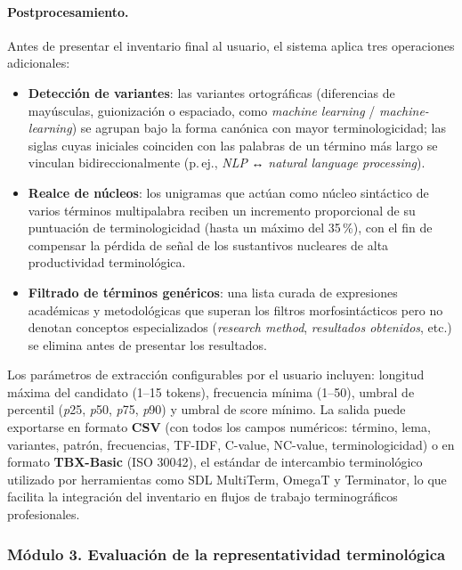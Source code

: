 \paragraph{Postprocesamiento.} Antes de presentar el inventario final al usuario, el sistema aplica tres operaciones adicionales:

\begin{itemize}
    \item \textbf{Detección de variantes}: las variantes ortográficas (diferencias de mayúsculas, guionización o espaciado, como \textit{machine learning} / \textit{machine-learning}) se agrupan bajo la forma canónica con mayor terminologicidad; las siglas cuyas iniciales coinciden con las palabras de un término más largo se vinculan bidireccionalmente (p.\,ej., \textit{NLP} ↔ \textit{natural language processing}).
    \item \textbf{Realce de núcleos}: los unigramas que actúan como núcleo sintáctico de varios términos multipalabra reciben un incremento proporcional de su puntuación de terminologicidad (hasta un máximo del 35\,\%), con el fin de compensar la pérdida de señal de los sustantivos nucleares de alta productividad terminológica.
    \item \textbf{Filtrado de términos genéricos}: una lista curada de expresiones académicas y metodológicas que superan los filtros morfosintácticos pero no denotan conceptos especializados (\textit{research method}, \textit{resultados obtenidos}, etc.) se elimina antes de presentar los resultados.
\end{itemize}

Los parámetros de extracción configurables por el usuario incluyen: longitud máxima del candidato (1--15 tokens), frecuencia mínima (1--50), umbral de percentil (\textit{p}25, \textit{p}50, \textit{p}75, \textit{p}90) y umbral de score mínimo. La salida puede exportarse en formato \textbf{CSV} (con todos los campos numéricos: término, lema, variantes, patrón, frecuencias, TF-IDF, C-value, NC-value, terminologicidad) o en formato \textbf{TBX-Basic} (ISO 30042), el estándar de intercambio terminológico utilizado por herramientas como SDL MultiTerm, OmegaT y Terminator, lo que facilita la integración del inventario en flujos de trabajo terminográficos profesionales.

\subsubsection*{Módulo 3. Evaluación de la representatividad terminológica}

